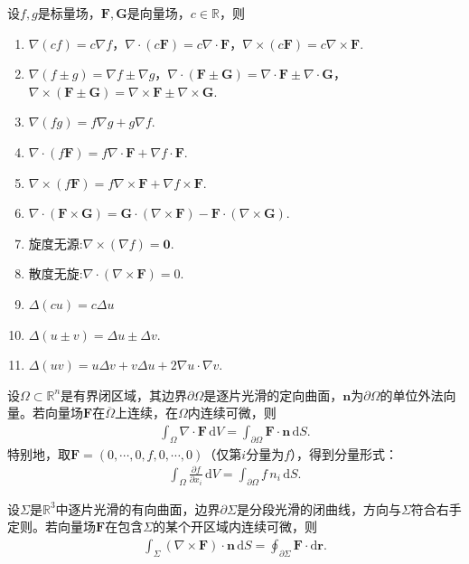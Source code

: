 \documentclass[../../main.tex]{subfiles}%
\begin{document}
\begin{theorem}
设$f,g$是标量场，$\bm{F},\bm{G}$是向量场，$c\in \mathbb{R}$，则
\begin{enumerate}[(1)]
\item $\nabla(cf)=c\nabla f$，$\nabla\cdot(c\bm{F})=c\nabla\cdot\bm{F}$，$\nabla\times(c\bm{F})=c\nabla\times\bm{F}$.
\item $\nabla(f\pm g)=\nabla f\pm\nabla g$，$\nabla\cdot(\bm{F}\pm\bm{G})=\nabla\cdot\bm{F}\pm\nabla\cdot\bm{G}$，$\nabla\times(\bm{F}\pm\bm{G})=\nabla\times\bm{F}\pm\nabla\times\bm{G}$.
\item $\nabla(fg)=f\nabla g+g\nabla f$.
\item $\nabla\cdot(f\bm{F})=f\nabla\cdot\bm{F}+\nabla f\cdot\bm{F}$.
\item $\nabla\times(f\bm{F})=f\nabla\times\bm{F}+\nabla f\times\bm{F}$.
\item $\nabla\cdot(\bm{F}\times\bm{G})=\bm{G}\cdot(\nabla\times\bm{F})-\bm{F}\cdot(\nabla\times\bm{G})$.
\item 旋度无源:$\nabla\times(\nabla f)=\bm{0}$.
\item 散度无旋:$\nabla\cdot(\nabla\times\bm{F})=0$.

\item $\Delta(cu)=c\Delta u$
\item $\Delta(u\pm v)=\Delta u\pm\Delta v$.
\item $\Delta(uv)=u\Delta v+v\Delta u+2\nabla u\cdot\nabla v$.
\end{enumerate}
\end{theorem}

\begin{theorem}[散度定理]\label{theorem:散度定理}
设$\Omega\subset\mathbb{R}^n$是有界闭区域，其边界$\partial\Omega$是逐片光滑的定向曲面，$\bm{n}$为$\partial\Omega$的单位外法向量。若向量场$\bm{F}$在$\overline{\Omega}$上连续，在$\Omega$内连续可微，则
\begin{align*}
\int_{\Omega}\nabla\cdot\bm{F}\,\mathrm{d}V=\int_{\partial\Omega}\bm{F}\cdot\bm{n}\,\mathrm{d}S. 
\end{align*}
特别地，取$\bm{F}=(0,\cdots,0,f,0,\cdots,0)$（仅第$i$分量为$f$），得到分量形式：
\begin{align*}
\int_{\Omega}\frac{\partial f}{\partial x_i}\,\mathrm{d}V=\int_{\partial\Omega}f\,n_i\,\mathrm{d}S. 
\end{align*}
\end{theorem}

\begin{theorem}[Stokes定理]\label{theorem:Stokes公式--多元函数}
设$\Sigma$是$\mathbb{R}^3$中逐片光滑的有向曲面，边界$\partial\Sigma$是分段光滑的闭曲线，方向与$\Sigma$符合右手定则。若向量场$\bm{F}$在包含$\Sigma$的某个开区域内连续可微，则
\begin{align*}
\int_{\Sigma}(\nabla\times\bm{F})\cdot\bm{n}\,\mathrm{d}S=\oint_{\partial\Sigma}\bm{F}\cdot\mathrm{d}\bm{r}. 
\end{align*}
\end{theorem}
\end{document}
